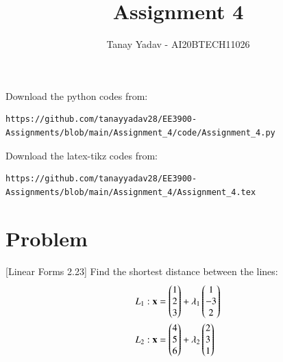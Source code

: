 \documentclass[journal,12pt,twocolumn]{IEEEtran}
\begin{document}
\let\vec\mathbf
\renewcommand{\thefigure}{\theproblem}
\def\putbox#1#2#3{\makebox[0in][l]{\makebox[#1][l]{}\raisebox{\baselineskip}[0in][0in]{\raisebox{#2}[0in][0in]{#3}}}}
     \def\rightbox#1{\makebox[0in][r]{#1}}
     \def\centbox#1{\makebox[0in]{#1}}
     \def\topbox#1{\raisebox{-\baselineskip}[0in][0in]{#1}}
     \def\midbox#1{\raisebox{-0.5\baselineskip}[0in][0in]{#1}}
\vspace{3cm}
\title{Assignment 4}
\author{Tanay Yadav - AI20BTECH11026}
\maketitle
\newpage
\bigskip
\renewcommand{\thefigure}{\theenumi}
\renewcommand{\thetable}{\theenumi}
Download the python codes from: 
%
\begin{lstlisting}
https://github.com/tanayyadav28/EE3900-Assignments/blob/main/Assignment_4/code/Assignment_4.py
\end{lstlisting}
Download the latex-tikz codes from: 
%
\begin{lstlisting}
https://github.com/tanayyadav28/EE3900-Assignments/blob/main/Assignment_4/Assignment_4.tex
\end{lstlisting}
\section{Problem}
[Linear Forms 2.23]
Find the shortest distance between the lines:
\begin{align}
    L_1 : \vec{x} &= \myvec{1\\2\\3} + \lambda_1 \myvec{1\\-3\\2}\\
    L_2 : \vec{x} &= \myvec{4\\5\\6} + \lambda_2 \myvec{2\\3\\1}
\end{align}
\end{document}
